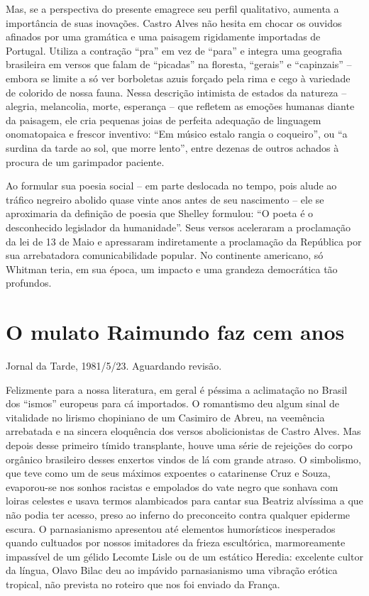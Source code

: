 \documentclass[
  letterpaper,
  DIV=11,
  numbers=noendperiod]{scrreprt}
\begin{document}
Mas, se a perspectiva do presente emagrece seu perfil qualitativo,
aumenta a importância de suas inovações. Castro Alves não hesita em
chocar os ouvidos afinados por uma gramática e uma paisagem rigidamente
importadas de Portugal. Utiliza a contração ``pra'' em vez de ``para'' e
integra uma geografia brasileira em versos que falam de ``picadas'' na
floresta, ``gerais'' e ``capinzais'' -- embora se limite a só ver
borboletas azuis forçado pela rima e cego à variedade de colorido de
nossa fauna. Nessa descrição intimista de estados da natureza --
alegria, melancolia, morte, esperança -- que refletem as emoções humanas
diante da paisagem, ele cria pequenas joias de perfeita adequação de
linguagem onomatopaica e frescor inventivo: ``Em músico estalo rangia o
coqueiro'', ou ``a surdina da tarde ao sol, que morre lento'', entre
dezenas de outros achados à procura de um garimpador paciente.

Ao formular sua poesia social -- em parte deslocada no tempo, pois alude
ao tráfico negreiro abolido quase vinte anos antes de seu nascimento --
ele se aproximaria da definição de poesia que Shelley formulou: ``O
poeta é o desconhecido legislador da humanidade''. Seus versos
aceleraram a proclamação da lei de 13 de Maio e apressaram indiretamente
a proclamação da República por sua arrebatadora comunicabilidade
popular. No continente americano, só Whitman teria, em sua época, um
impacto e uma grandeza democrática tão profundos.

\chapter{O mulato Raimundo faz cem
anos}\label{o-mulato-raimundo-faz-cem-anos}

Jornal da Tarde, 1981/5/23. Aguardando revisão.

\hfill\break

Felizmente para a nossa literatura, em geral é péssima a aclimatação no
Brasil dos ``ismos'' europeus para cá importados. O romantismo deu algum
sinal de vitalidade no lirismo chopiniano de um Casimiro de Abreu, na
veemência arrebatada e na sincera eloquência dos versos abolicionistas
de Castro Alves. Mas depois desse primeiro tímido transplante, houve uma
série de rejeições do corpo orgânico brasileiro desses enxertos vindos
de lá com grande atraso. O simbolismo, que teve como um de seus máximos
expoentes o catarinense Cruz e Souza, evaporou-se nos sonhos racistas e
empolados do vate negro que sonhava com loiras celestes e usava termos
alambicados para cantar sua Beatriz alvíssima a que não podia ter
acesso, preso ao inferno do preconceito contra qualquer epiderme escura.
O parnasianismo apresentou até elementos humorísticos inesperados quando
cultuados por nossos imitadores da frieza escultórica, marmoreamente
impassível de um gélido Lecomte Lisle ou de um estático Heredia:
excelente cultor da língua, Olavo Bilac deu ao impávido parnasianismo
uma vibração erótica tropical, não prevista no roteiro que nos foi
enviado da França.
\end{document}
